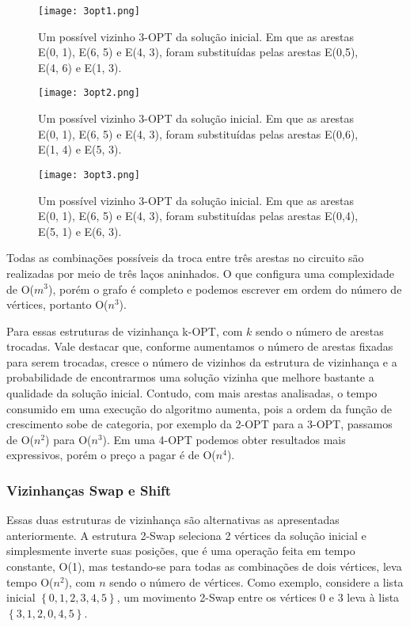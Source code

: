\documentclass[12pt, a4paper]{article}
\begin{document}
\begin{figure}[htb!]
\centering
\texttt{[image: 3opt1.png]}
\caption{Um possível vizinho 3-OPT da solução inicial. Em que as arestas E(0, 1), E(6, 5) e E(4, 3), foram substituídas pelas arestas E(0,5), E(4, 6) e E(1, 3).}
\label{fig:3opt1}
\end{figure}

\begin{figure}[htb!]
\centering
\texttt{[image: 3opt2.png]}
\caption{Um possível vizinho 3-OPT da solução inicial. Em que as arestas E(0, 1), E(6, 5) e E(4, 3), foram substituídas pelas arestas E(0,6), E(1, 4) e E(5, 3).}
\label{fig:3opt2}
\end{figure}

\begin{figure}[htb!]
\centering
\texttt{[image: 3opt3.png]}
\caption{Um possível vizinho 3-OPT da solução inicial. Em que as arestas E(0, 1), E(6, 5) e E(4, 3), foram substituídas pelas arestas E(0,4), E(5, 1) e E(6, 3).}
\label{fig:3opt3}
\end{figure}

Todas as combinações possíveis da troca entre três arestas no circuito são realizadas por meio de três laços aninhados. O que configura uma complexidade de O($m^3$), porém o grafo é completo e podemos escrever em ordem do número de vértices, portanto O($n^3$). \par
Para essas estruturas de vizinhança k-OPT, com $k$ sendo o número de arestas trocadas. Vale destacar que, conforme aumentamos o número de arestas fixadas para serem trocadas, cresce o número de vizinhos da estrutura de vizinhança e a probabilidade de encontrarmos uma solução vizinha que melhore bastante a qualidade da solução inicial. Contudo, com mais arestas analisadas, o tempo consumido em uma execução do algoritmo aumenta, pois a ordem da função de crescimento sobe de categoria, por exemplo da 2-OPT para a 3-OPT, passamos de O($n^2$) para O($n^3$). Em uma 4-OPT podemos obter resultados mais expressivos, porém o preço a pagar é de O($n^4$).

\subsubsection{Vizinhanças Swap e Shift}

Essas duas estruturas de vizinhança são alternativas as apresentadas anteriormente. A estrutura 2-Swap seleciona 2 vértices da solução inicial e simplesmente inverte suas posições, que é uma operação feita em tempo constante, O(1), mas testando-se para todas as combinações de dois vértices, leva tempo O($n^2$), com $n$ sendo o número de vértices. Como exemplo, considere a lista inicial $\left\{0, 1, 2, 3, 4, 5\right\}$, um movimento 2-Swap entre os vértices $0$ e $3$ leva à lista $\left\{3, 1, 2, 0, 4, 5\right\}$.
\end{document}
